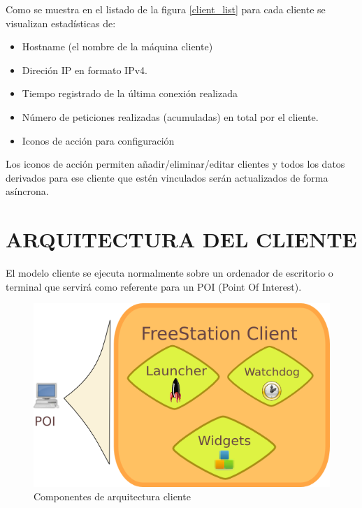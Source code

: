 \newpage

Como se muestra en el listado de la figura \ref{client_list} para cada cliente
se visualizan estadísticas de:

\begin{itemize}
  \item Hostname (el nombre de la máquina cliente)
  \item Direción IP en formato IPv4.
  \item Tiempo registrado de la última conexión realizada
  \item Número de peticiones realizadas (acumuladas) en total por el cliente.
  \item Iconos de acción para configuración
\end{itemize}

Los iconos de acción permiten añadir/eliminar/editar clientes y todos los datos
derivados para ese cliente que estén vinculados serán actualizados de forma
asíncrona.

\section{\uppercase{Arquitectura del cliente}}

El modelo cliente se ejecuta normalmente sobre un ordenador de escritorio o
terminal que servirá como referente para un POI (Point Of Interest).

\begin{figure}[hb]
    \begin{center}
        \includegraphics[scale=0.8]{src/img/client-diagram.png}
        \caption[Componentes de arquitectura cliente]
          {Componentes de arquitectura cliente}
    \end{center}
\end{figure}

